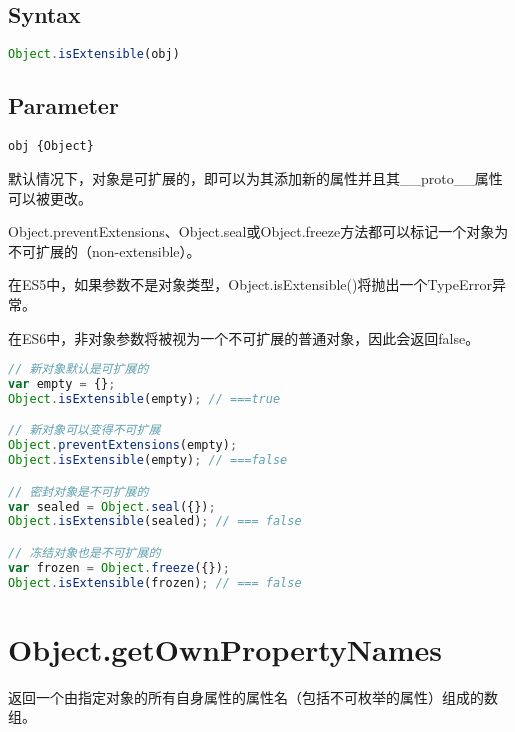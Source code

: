 \subsection{Syntax}


\begin{lstlisting}[language=JavaScript]
Object.isExtensible(obj)
\end{lstlisting}


\subsection{Parameter}


\begin{compactitem}
\item \texttt{obj \{Object\} }
\end{compactitem}

默认情况下，对象是可扩展的，即可以为其添加新的属性并且其\_\_proto\_\_属性可以被更改。

Object.preventExtensions、Object.seal或Object.freeze方法都可以标记一个对象为不可扩展的（non-extensible）。

\begin{compactitem}
\item 在ES5中，如果参数不是对象类型，Object.isExtensible()将抛出一个TypeError异常。
\item 在ES6中，非对象参数将被视为一个不可扩展的普通对象，因此会返回false。
\end{compactitem}



\begin{lstlisting}[language=JavaScript]
// 新对象默认是可扩展的
var empty = {};
Object.isExtensible(empty); // ===true

// 新对象可以变得不可扩展
Object.preventExtensions(empty);
Object.isExtensible(empty); // ===false

// 密封对象是不可扩展的
var sealed = Object.seal({});
Object.isExtensible(sealed); // === false

// 冻结对象也是不可扩展的
var frozen = Object.freeze({});
Object.isExtensible(frozen); // === false
\end{lstlisting}



\section{Object.getOwnPropertyNames}

返回一个由指定对象的所有自身属性的属性名（包括不可枚举的属性）组成的数组。

